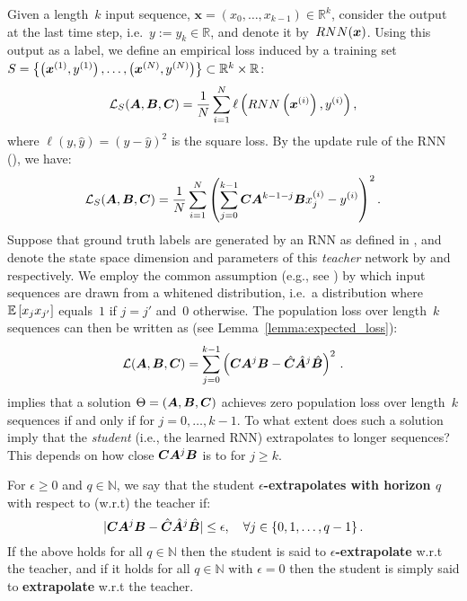 Given a length~$k$ input sequence, $\mathbf{x}=(x_0,\dots,x_{k-1}) \in \mathbb{R}^k$, consider the output at the last time step, i.e.~$y:=y_k \in \mathbb{R}$, and denote it by~$RNN ( {\bm{x}} )$.
Using this output as a label, we define an empirical loss induced by a training set $S=\left\lbrace \left({\bm{x}}^{(1)},y^{(1)}\right),\dots, \left({\bm{x}}^{(N)},y^{(N)}\right) \right\rbrace \subset \mathbb{R}^k \times \mathbb{R}$:
\begin{equation}
    \mathcal{L}_S({\bm{A}},{\bm{B}},{\bm{C}})=\frac{1}{N}\sum_{i=1}^N \ell\left( RNN\left({\bm{x}}^{(i)}\right), y^{(i)}\right),
\end{equation}
where $\ell(y,\hat{y})=(y-\hat{y})^2$ is the square loss. 
By the update rule of the RNN (), we have:
\begin{equation}\label{eq:empirical_loss}
    \mathcal{L}_S({\bm{A}},{\bm{B}},{\bm{C}}) = \frac{1}{N}\sum_{i=1}^N \left( \sum_{j=0}^{k-1}{\bm{C}}{\bm{A}}^{k-1-j}{\bm{B}} x_j^{(i)} - y^{(i)} \right)^2.
\end{equation}
Suppose that ground truth labels are generated by an RNN as defined in , and denote the state space dimension and parameters of this \emph{teacher} network by  and \smash{$\hat{\Theta} = (\hat{\mA},\hat{\mB},\hat{\mC})$} respectively.
We employ the common assumption (e.g., see \cite{hardt2016gradient}) by which input sequences are drawn from a whitened distribution, i.e.~a distribution where $\mathbb{E}\left[ x_j x_{j'} \right]$ equals~$1$ if $j = j'$ and~$0$ otherwise.
The population loss over length~$k$ sequences can then be written as (see Lemma~\ref{lemma:expected_loss}):
\begin{equation}\label{eq:population_loss}
    \mathcal{L}({\bm{A}},{\bm{B}},{\bm{C}})=\sum_{j=0}^{k-1} \left({\bm{C}}{\bm{A}}^j {\bm{B}}-\hat{{\bm{C}}}\hat{{\bm{A}}}^j\hat{{\bm{B}}}\right)^2
    \text{\,.}
\end{equation}
 implies that a solution $\Theta = ( {\bm{A}} , {\bm{B}} , {\bm{C}} )$ achieves zero population loss over length~$k$ sequences if and only if  for $j=0,\dots,k-1$.
To what extent does such a solution imply that the \emph{student} (i.e., the learned RNN) extrapolates to longer sequences?
This depends on how close ${\bm{C}} {\bm{A}}^j {\bm{B}}$ is to  for $j \geq k$.
\begin{definition}\label{def:extrapolation}
For $\epsilon \geq 0$ and $q \in \mathbb{N}$, we say that the student \textbf{$\epsilon$-extrapolates with horizon $q$} with respect to (w.r.t) the teacher if: 
\begin{equation}
    |{\bm{C}}{\bm{A}}^j {\bm{B}}-\hat{{\bm{C}}}\hat{{\bm{A}}}^j\hat{{\bm{B}}}| \leq \epsilon,
    \quad
    \forall j \in \{ 0 , 1 , \ldots , q - 1 \}
    \text{\,.}
\end{equation}
If the above holds for all $q \in \mathbb{N}$ then the student is said to \textbf{$\epsilon$-extrapolate} w.r.t the teacher, and if it holds for all $q \in \mathbb{N}$ with $\epsilon = 0$ then the student is simply said to \textbf{extrapolate} w.r.t the teacher.
\end{definition}
